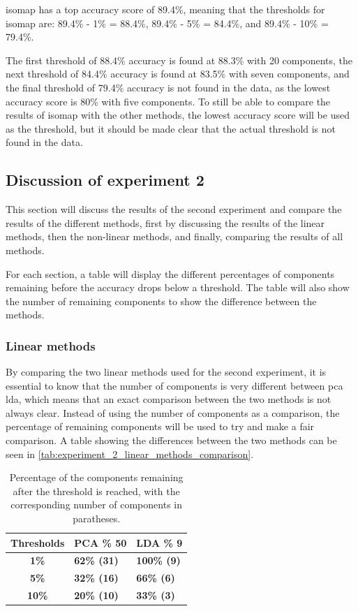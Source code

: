 isomap has a top accuracy score of 89.4\%, meaning that the thresholds for \gls{isomap}  are: 89.4\% - 1\% = 88.4\%, 89.4\% - 5\% = 84.4\%, and 89.4\% - 10\% = 79.4\%. 

The first threshold of 88.4\% accuracy is found at 88.3\% with 20 components, the next threshold of 84.4\% accuracy is found at 83.5\% with seven components, and the final threshold of 79.4\% accuracy is not found in the data, as the lowest accuracy score is 80\% with five components. To still be able to compare the results of \gls{isomap}  with the other methods, the lowest accuracy score will be used as the threshold, but it should be made clear that the actual threshold is not found in the data.


\subsection{Discussion of experiment 2}\label{subsec:experiment_2_discussion}
This section will discuss the results of the second experiment and compare the results of the different methods, first by discussing the results of the linear methods, then the non-linear methods, and finally, comparing the results of all methods.

For each section, a table will display the different percentages of components remaining before the accuracy drops below a threshold. The table will also show the number of remaining components to show the difference between the methods.


\subsubsection{Linear methods}
By comparing the two linear methods used for the second experiment, it is essential to know that the number of components is very different between \gls{pca} \gls{lda}, which means that an exact comparison between the two methods is not always clear. Instead of using the number of components as a comparison, the percentage of remaining components will be used to try and make a fair comparison. A table showing the differences between the two methods can be seen in \autoref{tab:experiment_2_linear_methods_comparison}.

\begin{table}[htb!]
    \centering
    \begin{tabular}{cp{}p{}}
        \toprule
        \textbf{Thresholds} & \textbf{PCA \% 50} & \textbf{LDA \% 9} \\
        \midrule
        \textbf{1\%} & \textbf{62\% (31)} & \textbf{100\% (9)} \\
        \textbf{5\%} & \textbf{32\% (16)} & \textbf{66\% (6)} \\
        \textbf{10\%} & \textbf{20\% (10)} & \textbf{33\% (3)} \\
        \bottomrule
    \end{tabular}
    \caption{Percentage of the components remaining after the threshold is reached, with the corresponding number of components in paratheses.}
    \label{tab:experiment_2_linear_methods_comparison}
\end{table}


